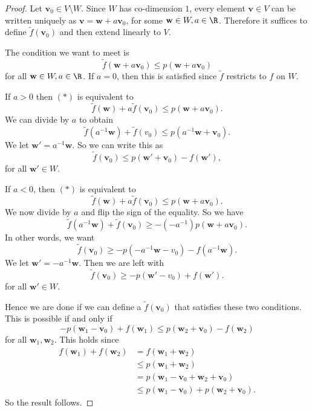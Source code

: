\documentclass[a4paper]{article}
\begin{document}
\begin{proof}
  Let $\mathbf{v}_0 \in V\setminus W$. Since $W$ has co-dimension $1$, every element $\mathbf{v}\in V$ can be written uniquely as $\mathbf{v} = \mathbf{w} + a \mathbf{v}_0$, for some $\mathbf{w}\in W, a\in \R$. Therefore it suffices to define $\tilde{f}(\mathbf{v}_0)$ and then extend linearly to $V$.

  The condition we want to meet is
  \[
    \tilde{f}(\mathbf{w} + a \mathbf{v}_0) \leq p(\mathbf{w} + a \mathbf{v}_0)\tag{$*$}
  \]
  for all $\mathbf{w} \in W, a \in \R$. If $a = 0$, then this is satisfied since $\tilde{f}$ restricts to $f$ on $W$.

  If $a > 0$ then $(*)$ is equivalent to
  \[
    \tilde{f}(\mathbf{w}) + a\tilde{f}(\mathbf{v}_0) \leq p(\mathbf{w} + a \mathbf{v}_0).
  \]
  We can divide by $a$ to obtain
  \[
    \tilde{f}(a^{-1}\mathbf{w}) + \tilde{f}(v_0) \leq p(a^{-1}\mathbf{w} + \mathbf{v}_0).
  \]
  We let $\mathbf{w}' = a^{-1} \mathbf{w}$. So we can write this as
  \[
    \tilde{f}(\mathbf{v}_0) \leq p(\mathbf{w}' + \mathbf{v}_0) - f(\mathbf{w}'),
  \]
  for all $\mathbf{w}'\in W$.

  If $a < 0$, then $(*)$ is equivalent to
  \[
    \tilde{f}(\mathbf{w}) + a\tilde{f}(\mathbf{v}_0) \leq p(\mathbf{w} + a \mathbf{v}_0).
  \]
  We now divide by $a$ and flip the sign of the equality. So we have
  \[
    \tilde{f}(a^{-1}\mathbf{w}) + \tilde{f}(\mathbf{v}_0) \geq -(-a^{-1})p(\mathbf{w} + a\mathbf{v}_0).
  \]
  In other words, we want
  \[
    \tilde{f}(\mathbf{v}_0) \geq -p(-a^{-1} \mathbf{w} - v_0) - f(a^{-1}\mathbf{w}).
  \]
  We let $\mathbf{w}' = -a^{-1}\mathbf{w}$. Then we are left with
  \[
    \tilde{f}(\mathbf{v}_0) \geq -p(\mathbf{w}' - v_0) + f(\mathbf{w}').
  \]
  for all $\mathbf{w}' \in W$.

  Hence we are done if we can define a $\tilde{f}(\mathbf{v}_0)$ that satisfies these two conditions. This is possible if and only if
  \[
    -p(\mathbf{w}_1 - \mathbf{v}_0) + f(\mathbf{w}_1) \leq p(\mathbf{w}_2 + \mathbf{v}_0) - f(\mathbf{w}_2)
  \]
  for all $\mathbf{w}_1, \mathbf{w}_2$. This holds since
  \begin{align*}
    f(\mathbf{w}_1) + f(\mathbf{w}_2) &= f(\mathbf{w}_1 + \mathbf{w}_2) \\
    &\leq p(\mathbf{w}_1 + \mathbf{w}_2) \\
    &= p(\mathbf{w}_1 - \mathbf{v}_0 + \mathbf{w}_2 + \mathbf{v}_0) \\
    &\leq p(\mathbf{w}_1 - \mathbf{v}_0) + p(\mathbf{w}_2 + \mathbf{v}_0).
  \end{align*}
  So the result follows.
\end{proof}
\end{document}
